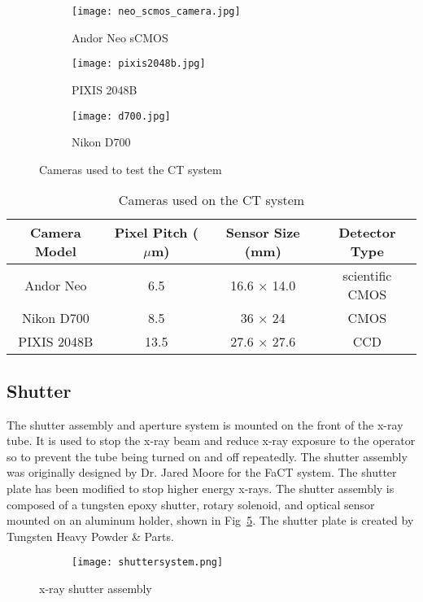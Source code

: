 \begin{figure}
\centering
	\begin{subfigure}[b]{0.3\linewidth}
	\texttt{[image: neo\_scmos\_camera.jpg]}
	\caption{Andor Neo sCMOS}
	\label{fig:neo}
	\end{subfigure}
\hspace{0.2cm}	
	\begin{subfigure}[b]{0.3\linewidth}
	\texttt{[image: pixis2048b.jpg]}
	\caption{PIXIS 2048B}
	\label{fig:pixis}
	\end{subfigure}
\hspace{0.2cm}
	\begin{subfigure}[b]{0.3\linewidth}
	\texttt{[image: d700.jpg]}
	\caption{Nikon D700}
	\label{fig:nikonD700}
	\end{subfigure}
\caption{Cameras used to test the CT system}
\label{fig:cameras}
\end{figure}

\begin{table}
\begin{tabular}{c|c|c|c}
\hline
Camera Model & Pixel Pitch ($\mu$m) & Sensor Size (mm) & Detector Type \\ \hline
Andor Neo & 6.5 & 16.6 $\times$ 14.0 & scientific CMOS \\ \hline
Nikon D700 & 8.5 & 36 $\times$ 24 & CMOS \\ \hline
PIXIS 2048B & 13.5 & 27.6 $\times$ 27.6 & CCD \\
\hline
\end{tabular}
\caption{Cameras used on the CT system}
\label{table:cameras}
\end{table}

\subsection{Shutter}
The shutter assembly and aperture system is mounted on the front of the x-ray tube.  It is used to stop the x-ray beam and reduce x-ray exposure to the operator so to prevent the tube being turned on and off repeatedly.  The shutter assembly was originally designed by Dr. Jared Moore for the FaCT system.  The shutter plate has been modified to stop higher energy x-rays.  The shutter assembly is composed of a tungsten epoxy shutter, rotary solenoid, and optical sensor mounted on an aluminum holder, shown in Fig~\ref{fig:shutter}.  The shutter plate is created by Tungsten Heavy Powder \& Parts.

\begin{figure}
\centering
	\begin{subfigure}{0.3\linewidth}
	\texttt{[image: shuttersystem.png]}
	\end{subfigure}
\hspace*{1cm}
	\begin{subfigure}{0.3\linewidth}
	\end{subfigure}	
\caption{x-ray shutter assembly}
\label{fig:shutter}
\end{figure}

